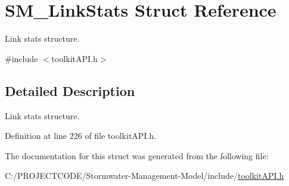 \hypertarget{struct_s_m___link_stats}{}\section{S\+M\+\_\+\+Link\+Stats Struct Reference}
\label{struct_s_m___link_stats}


Link stats structure.  




{\ttfamily \#include $<$toolkit\+A\+P\+I.\+h$>$}



\subsection{Detailed Description}
Link stats structure. 

Definition at line 226 of file toolkit\+A\+P\+I.\+h.



The documentation for this struct was generated from the following file\+:\begin{DoxyCompactItemize}
\item 
C\+:/\+P\+R\+O\+J\+E\+C\+T\+C\+O\+D\+E/\+Stormwater-\/\+Management-\/\+Model/include/\hyperlink{toolkit_a_p_i_8h}{toolkit\+A\+P\+I.\+h}\end{DoxyCompactItemize}
